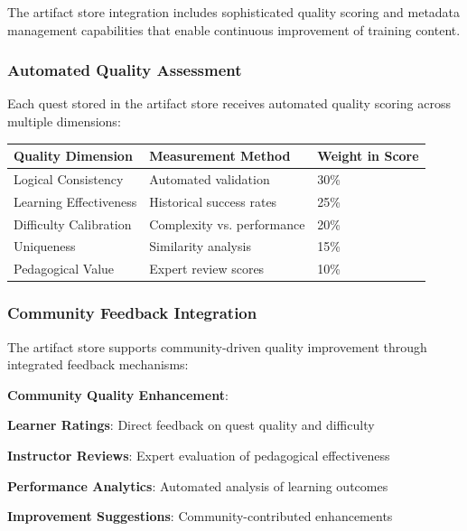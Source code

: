 The artifact store integration includes sophisticated quality scoring and metadata management capabilities that enable continuous improvement of training content.

\subsubsection*{Automated Quality Assessment}

Each quest stored in the artifact store receives automated quality scoring across multiple dimensions:

\begin{center}
\begin{tabular}{@{}lll@{}}
\toprule
\textbf{Quality Dimension} & \textbf{Measurement Method} & \textbf{Weight in Score} \\
\midrule
Logical Consistency & Automated validation & 30\% \\
Learning Effectiveness & Historical success rates & 25\% \\
Difficulty Calibration & Complexity vs. performance & 20\% \\
Uniqueness & Similarity analysis & 15\% \\
Pedagogical Value & Expert review scores & 10\% \\
\bottomrule
\end{tabular}
\end{center}

\subsubsection*{Community Feedback Integration}

The artifact store supports community-driven quality improvement through integrated feedback mechanisms:

\begin{successbox}
\textbf{Community Quality Enhancement}:
\begin{compactlist}
    \item \textbf{Learner Ratings}: Direct feedback on quest quality and difficulty
    \item \textbf{Instructor Reviews}: Expert evaluation of pedagogical effectiveness
    \item \textbf{Performance Analytics}: Automated analysis of learning outcomes
    \item \textbf{Improvement Suggestions}: Community-contributed enhancements
\end{compactlist}
\end{successbox}

